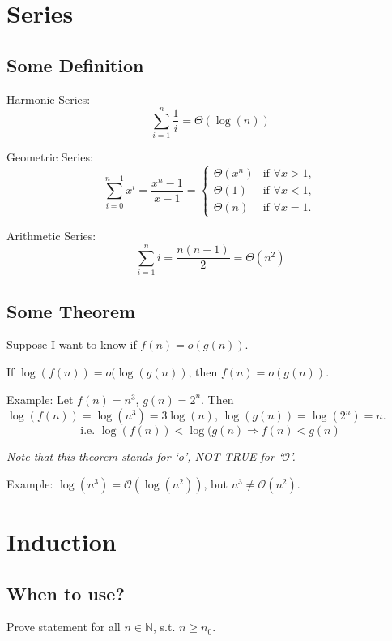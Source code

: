 
\section{Series}
\subsection{Some Definition}

\begin{definition}
Harmonic Series:
\[\sum_{i=1}^n {\frac{1}{i}} = \Theta(\log(n))\]
\end{definition}

\begin{definition}
Geometric Series:
\[
\sum_{i=0}^{n-1}{x^i} = \frac{x^n - 1}{x-1} =
\begin{cases}
\Theta(x^n) & \text{if } \forall x>1, \\
\Theta(1) & \text{if } \forall x<1, \\
\Theta(n) & \text{if } \forall x=1.
\end{cases}
\]
\end{definition}

\begin{definition}
Arithmetic Series:
\[\sum_{i=1}^n {i} = \frac{n(n+1)}{2} = \Theta(n^2)\]

\end{definition}

\subsection{Some Theorem}

Suppose I want to know if $f(n) = o(g(n))$.

\begin{theorem}
If $\log(f(n)) = o(\log(g(n))$, then $f(n) = o(g(n))$.
\end{theorem}

Example: Let $f(n) = n^3$, $g(n) = 2^n$. Then $\log(f(n)) = \log(n^3) = 3\log(n)$, $\log(g(n)) = \log(2^n) = n$.
\[\text{i.e. } \log(f(n)) < \log(g(n) \Rightarrow f(n) < g(n)\]

\emph{Note that this theorem stands for `o', NOT TRUE for `$\mathcal{O}$'.}

Example: $\log(n^3) = \mathcal{O}(\log(n^2))$, but $n^3 \neq \mathcal{O}(n^2)$.

\section{Induction}
\subsection{When to use?}
Prove statement for all $n \in \mathbb{N}$, s.t. $n \geq n_0$.

